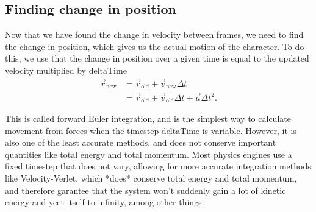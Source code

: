 \documentclass[%
notitlepage,
 amsmath,amssymb,
 aps,
]{revtex4-2}  %
\begin{document}
\subsection{Finding change in position} \label{sec:Sliding:subsec:FindPos}
Now that we have found the change in velocity between frames, we need to find the change in position, which gives us the actual motion of the character. To do this, we use that the change in position over a given time is equal to the updated velocity multiplied by deltaTime
\begin{align*}
    \vec{r}_{\text{new}} &= \vec{r}_{\text{old}} + \vec{v}_{\text{new}}\Delta t \\
                         &= \vec{r}_{\text{old}} + \vec{v}_{\text{old}}\Delta t + \vec{a}\Delta t^{2}.
\end{align*}

This is called forward Euler integration, and is the simplest way to calculate movement from forces when the timestep deltaTime is variable. However, it is also one of the least accurate methods, and does not conserve important quantities like total energy and total momentum. Most physics engines use a fixed timestep that does not vary, allowing for more accurate integration methods like Velocity-Verlet, which *does* conserve total energy and total momentum, and therefore garantee that the system won't suddenly gain a lot of kinetic energy and yeet itself to infinity, among other things.
\end{document}
